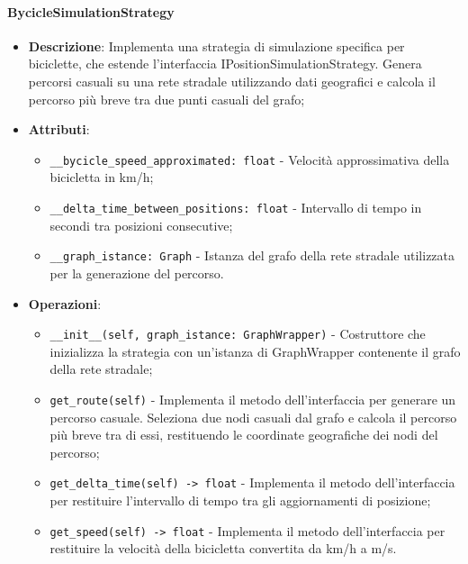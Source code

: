 \documentclass[10pt]{article}
\begin{document}
    \paragraph{BycicleSimulationStrategy}
    \begin{itemize} 
    \item \textbf{Descrizione}: Implementa una strategia di simulazione specifica per biciclette, che estende l'interfaccia IPositionSimulationStrategy. Genera percorsi casuali su una rete stradale utilizzando dati geografici e calcola il percorso più breve tra due punti casuali del grafo;
    \item \textbf{Attributi}:
    \begin{itemize}
        \item \texttt{\_\_bycicle\_speed\_approximated: float} - Velocità approssimativa della bicicletta in km/h;
        \item \texttt{\_\_delta\_time\_between\_positions: float} - Intervallo di tempo in secondi tra posizioni consecutive;
        \item \texttt{\_\_graph\_istance: Graph} - Istanza del grafo della rete stradale utilizzata per la generazione del percorso.
    \end{itemize}
    
    \item \textbf{Operazioni}:
    \begin{itemize}
        \item \texttt{\_\_init\_\_(self, graph\_istance: GraphWrapper)} - Costruttore che inizializza la strategia con un'istanza di GraphWrapper contenente il grafo della rete stradale;
        
        \item \texttt{get\_route(self)} - Implementa il metodo dell'interfaccia per generare un percorso casuale. Seleziona due nodi casuali dal grafo e calcola il percorso più breve tra di essi, restituendo le coordinate geografiche dei nodi del percorso;
        
        \item \texttt{get\_delta\_time(self) -> float} - Implementa il metodo dell'interfaccia per restituire l'intervallo di tempo tra gli aggiornamenti di posizione;
        
        \item \texttt{get\_speed(self) -> float} - Implementa il metodo dell'interfaccia per restituire la velocità della bicicletta convertita da km/h a m/s.
    \end{itemize}
    \end{itemize}
\end{document}
